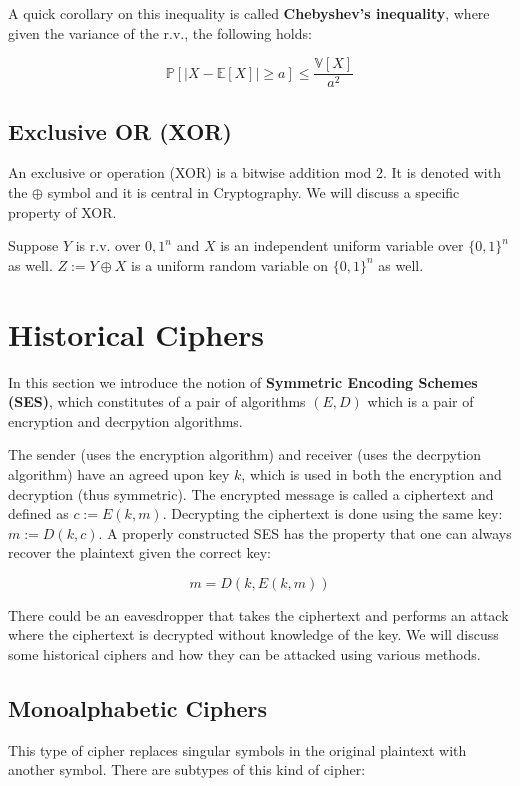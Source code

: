 \documentclass{article}
\begin{document}
\begin{multicols}{2}
A quick corollary on this inequality is called \textbf{Chebyshev's inequality}, where given the variance of the r.v., the following holds:

$$
\mathbb{P}[|X - \mathbb{E}[X]| \geq a] \leq \frac{\mathbb{V}[X]}{a^2}
$$

\subsection{Exclusive OR (XOR)}

An exclusive or operation (XOR) is a bitwise addition mod 2. It is denoted with the $\oplus$ symbol and it is central in Cryptography. We will discuss a specific property of XOR.

Suppose $Y$ is r.v. over ${0,1}^n$ and $X$ is an independent uniform variable over $\{0,1\}^n$ as well. $Z := Y \oplus X$ is a uniform random variable on $\{0,1\}^n$ as well.

\section{Historical Ciphers}

In this section we introduce the notion of \textbf{Symmetric Encoding Schemes (SES)}, which constitutes of a pair of algorithms $(E,D)$ which is a pair of encryption and decrpytion algorithms. 

The sender (uses the encryption algorithm) and receiver (uses the decrpytion algorithm) have an agreed upon key $k$, which is used in both the encryption and decryption (thus symmetric). The encrypted message is called a ciphertext and defined as $c:= E(k,m)$. Decrypting the ciphertext is done using the same key: $m := D(k,c)$. A properly constructed SES has the property that one can always recover the plaintext given the correct key:

$$
m = D(k,E(k,m))
$$

There could be an eavesdropper that takes the ciphertext and performs an attack where the ciphertext is decrypted without knowledge of the key. We will discuss some historical ciphers and how they can be attacked using various methods.

\subsection{Monoalphabetic Ciphers}

This type of cipher replaces singular symbols in the original plaintext with another symbol. There are subtypes of this kind of cipher:


\end{multicols}
\end{document}

